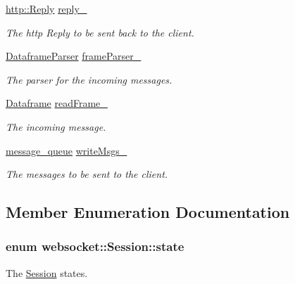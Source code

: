 \begin{DoxyCompactItemize}
\hyperlink{structwebsocket_1_1http_1_1Reply}{http\+::\+Reply} \hyperlink{classwebsocket_1_1Session_a938563bfc401a7446f87a60acc642800}{reply\+\_\+}
\begin{DoxyCompactList}\small\item\em The http Reply to be sent back to the client. \end{DoxyCompactList}\item 
\hyperlink{classwebsocket_1_1DataframeParser}{Dataframe\+Parser} \hyperlink{classwebsocket_1_1Session_add7f041fe3badd9bea5158a412d4c33b}{frame\+Parser\+\_\+}
\begin{DoxyCompactList}\small\item\em The parser for the incoming messages. \end{DoxyCompactList}\item 
\hyperlink{structwebsocket_1_1Dataframe}{Dataframe} \hyperlink{classwebsocket_1_1Session_a2ea49f75569589cc80cb9dbcfa7707ee}{read\+Frame\+\_\+}
\begin{DoxyCompactList}\small\item\em The incoming message. \end{DoxyCompactList}\item 
\hyperlink{namespacewebsocket_ae3fdf29bb367b5baf5be703253a4edfa}{message\+\_\+queue} \hyperlink{classwebsocket_1_1Session_ace231022157030f4d56de9bfeff43ac7}{write\+Msgs\+\_\+}
\begin{DoxyCompactList}\small\item\em The messages to be sent to the client. \end{DoxyCompactList}\end{DoxyCompactItemize}


\subsection{Member Enumeration Documentation}
\subsubsection[{\texorpdfstring{state}{state}}]{\setlength{\rightskip}{0pt plus 5cm}enum {\bf websocket\+::\+Session\+::state}}\hypertarget{classwebsocket_1_1Session_a643e11bb9d05b580f20ff232f3582c1b}{}\label{classwebsocket_1_1Session_a643e11bb9d05b580f20ff232f3582c1b}


The \hyperlink{classwebsocket_1_1Session}{Session} states. 

